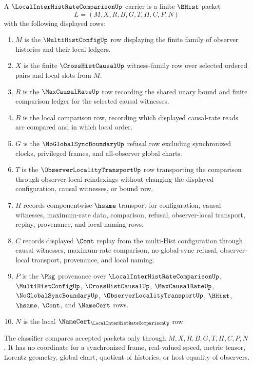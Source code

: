 \begin{definition}
\label{def:local-interhist-rate-comparison-carrier}
A $\LocalInterHistRateComparisonUp$ carrier is a finite $\BHist$ packet
$$
L=(M,X,R,B,G,T,H,C,P,N)
$$
with the following displayed rows:
\begin{enumerate}
\item $M$ is the $\MultiHistConfigUp$ row displaying the finite family of observer histories and their local ledgers.
\item $X$ is the finite $\CrossHistCausalUp$ witness-family row over selected ordered pairs and local slots from $M$.
\item $R$ is the $\MaxCausalRateUp$ row recording the shared unary bound and finite comparison ledger for the selected causal witnesses.
\item $B$ is the local comparison row, recording which displayed causal-rate reads are compared and in which local order.
\item $G$ is the $\NoGlobalSyncBoundaryUp$ refusal row excluding synchronized clocks, privileged frames, and all-observer global charts.
\item $T$ is the $\ObserverLocalityTransportUp$ row transporting the comparison through observer-local reindexings without changing the displayed configuration, causal witnesses, or bound row.
\item $H$ records componentwise $\hsame$ transport for configuration, causal witnesses, maximum-rate data, comparison, refusal, observer-local transport, replay, provenance, and local naming rows.
\item $C$ records displayed $\Cont$ replay from the multi-Hist configuration through causal witnesses, maximum-rate comparison, no-global-sync refusal, observer-local transport, provenance, and local naming.
\item $P$ is the $\Pkg$ provenance over $\LocalInterHistRateComparisonUp$, $\MultiHistConfigUp$, $\CrossHistCausalUp$, $\MaxCausalRateUp$, $\NoGlobalSyncBoundaryUp$, $\ObserverLocalityTransportUp$, $\BHist$, $\hsame$, $\Cont$, and $\NameCert$ rows.
\item $N$ is the local $\NameCert_{\LocalInterHistRateComparisonUp}$ row.
\end{enumerate}
The classifier compares accepted packets only through $M,X,R,B,G,T,H,C,P,N$. It has no coordinate for a synchronized frame, real-valued speed, metric tensor, Lorentz geometry, global chart, quotient of histories, or host equality of observers.
\end{definition}


